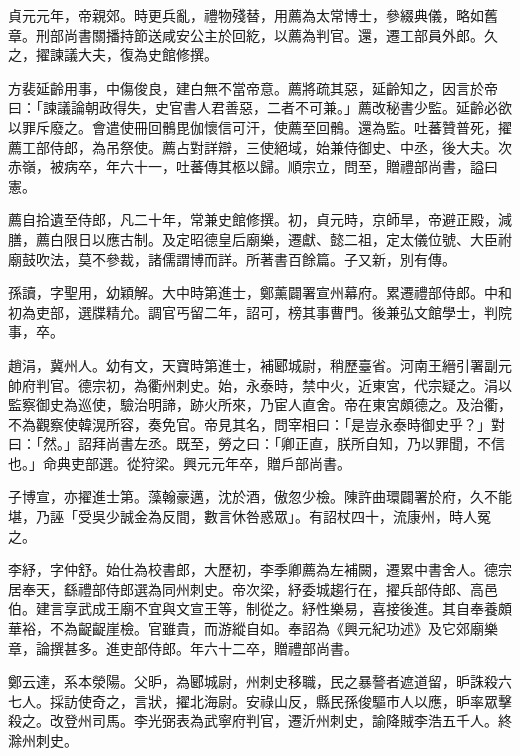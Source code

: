 \begin{pinyinscope}
 貞元元年，帝親郊。時更兵亂，禮物殘替，用薦為太常博士，參綴典儀，略如舊章。刑部尚書關播持節送咸安公主於回紇，以薦為判官。還，遷工部員外郎。久之，擢諫議大夫，復為史館修撰。



 方裴延齡用事，中傷俊良，建白無不當帝意。薦將疏其惡，延齡知之，因言於帝曰：「諫議論朝政得失，史官書人君善惡，二者不可兼。」薦改秘書少監。延齡必欲以罪斥廢之。會遣使冊回鶻毘伽懷信可汗，使薦至回鶻。還為監。吐蕃贊普死，擢薦工部侍郎，為吊祭使。薦占對詳辯，三使絕域，始兼侍御史、中丞，後大夫。次赤嶺，被病卒，年六十一，吐蕃傳其柩以歸。順宗立，問至，贈禮部尚書，謚曰憲。



 薦自拾遺至侍郎，凡二十年，常兼史館修撰。初，貞元時，京師旱，帝避正殿，減膳，薦白限日以應古制。及定昭德皇后廟樂，遷獻、懿二祖，定太儀位號、大臣祔廟鼓吹法，莫不參裁，諸儒謂博而詳。所著書百餘篇。子又新，別有傳。



 孫讀，字聖用，幼穎解。大中時第進士，鄭薰闢署宣州幕府。累遷禮部侍郎。中和初為吏部，選牒精允。調官丐留二年，詔可，榜其事曹門。後兼弘文館學士，判院事，卒。



 趙涓，冀州人。幼有文，天寶時第進士，補郾城尉，稍歷臺省。河南王縉引署副元帥府判官。德宗初，為衢州刺史。始，永泰時，禁中火，近東宮，代宗疑之。涓以監察御史為巡使，驗治明諦，跡火所來，乃宦人直舍。帝在東宮頗德之。及治衢，不為觀察使韓滉所容，奏免官。帝見其名，問宰相曰：「是豈永泰時御史乎？」對曰：「然。」詔拜尚書左丞。既至，勞之曰：「卿正直，朕所自知，乃以罪聞，不信也。」命典吏部選。從狩梁。興元元年卒，贈戶部尚書。



 子博宣，亦擢進士第。藻翰豪邁，沈於酒，傲忽少檢。陳許曲環闢署於府，久不能堪，乃誣「受吳少誠金為反間，數言休咎惑眾」。有詔杖四十，流康州，時人冤之。



 李紓，字仲舒。始仕為校書郎，大歷初，李季卿薦為左補闕，遷累中書舍人。德宗居奉天，繇禮部侍郎選為同州刺史。帝次梁，紓委城趨行在，擢兵部侍郎、高邑伯。建言享武成王廟不宜與文宣王等，制從之。紓性樂易，喜接後進。其自奉養頗華裕，不為齪齪崖檢。官雖貴，而游縱自如。奉詔為《興元紀功述》及它郊廟樂章，論撰甚多。進吏部侍郎。年六十二卒，贈禮部尚書。



 鄭云達，系本滎陽。父昈，為郾城尉，州刺史移職，民之暴謷者遮道留，昈誅殺六七人。採訪使奇之，言狀，擢北海尉。安祿山反，縣民孫俊驅市人以應，昈率眾擊殺之。改登州司馬。李光弼表為武寧府判官，遷沂州刺史，諭降賊李浩五千人。終滁州刺史。




\end{pinyinscope}
